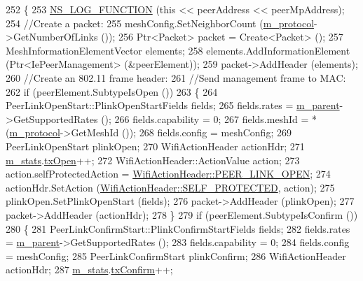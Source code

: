 \begin{DoxyCode}
252 \{
253   \hyperlink{log-macros-disabled_8h_a90b90d5bad1f39cb1b64923ea94c0761}{NS\_LOG\_FUNCTION} (\textcolor{keyword}{this} << peerAddress << peerMpAddress);
254   \textcolor{comment}{//Create a packet:}
255   meshConfig.SetNeighborCount (\hyperlink{classns3_1_1dot11s_1_1PeerManagementProtocolMac_afbdd1f31cd54c320267ffb3426559095}{m\_protocol}->GetNumberOfLinks ());
256   Ptr<Packet> packet = Create<Packet> ();
257   MeshInformationElementVector elements;
258   elements.AddInformationElement (Ptr<IePeerManagement> (&peerElement));
259   packet->AddHeader (elements);
260   \textcolor{comment}{//Create an 802.11 frame header:}
261   \textcolor{comment}{//Send management frame to MAC:}
262   \textcolor{keywordflow}{if} (peerElement.SubtypeIsOpen ())
263     \{
264       PeerLinkOpenStart::PlinkOpenStartFields fields;
265       fields.rates = \hyperlink{classns3_1_1dot11s_1_1PeerManagementProtocolMac_a14edf9af29af164f967ccc6e77d8ea03}{m\_parent}->GetSupportedRates ();
266       fields.capability = 0;
267       fields.meshId = *(\hyperlink{classns3_1_1dot11s_1_1PeerManagementProtocolMac_afbdd1f31cd54c320267ffb3426559095}{m\_protocol}->GetMeshId ());
268       fields.config = meshConfig;
269       PeerLinkOpenStart plinkOpen;
270       WifiActionHeader actionHdr;
271       \hyperlink{classns3_1_1dot11s_1_1PeerManagementProtocolMac_aaaccd87941623a8bff20e8998908b518}{m\_stats}.\hyperlink{structns3_1_1dot11s_1_1PeerManagementProtocolMac_1_1Statistics_a123e67cf28f2bc5fc27ae64dea07f5ab}{txOpen}++;
272       WifiActionHeader::ActionValue action;
273       action.selfProtectedAction = \hyperlink{classns3_1_1WifiActionHeader_a17cfd6c8f685a44e7b7b832cc9a53e83a5d1c8a5ef38c884f951cfe32e03ca572}{WifiActionHeader::PEER\_LINK\_OPEN};
274       actionHdr.SetAction (\hyperlink{classns3_1_1WifiActionHeader_a5402becd11b4077f22d76c4d0d923358a0d41e6327b2a9ae590e3020f378e40e4}{WifiActionHeader::SELF\_PROTECTED}, action); 
275       plinkOpen.SetPlinkOpenStart (fields);
276       packet->AddHeader (plinkOpen);
277       packet->AddHeader (actionHdr);
278     \}
279   \textcolor{keywordflow}{if} (peerElement.SubtypeIsConfirm ())
280     \{
281       PeerLinkConfirmStart::PlinkConfirmStartFields fields;
282       fields.rates = \hyperlink{classns3_1_1dot11s_1_1PeerManagementProtocolMac_a14edf9af29af164f967ccc6e77d8ea03}{m\_parent}->GetSupportedRates ();
283       fields.capability = 0;
284       fields.config = meshConfig;
285       PeerLinkConfirmStart plinkConfirm;
286       WifiActionHeader actionHdr;
287       \hyperlink{classns3_1_1dot11s_1_1PeerManagementProtocolMac_aaaccd87941623a8bff20e8998908b518}{m\_stats}.\hyperlink{structns3_1_1dot11s_1_1PeerManagementProtocolMac_1_1Statistics_a355443c5159b773a2506e919d97df368}{txConfirm}++;

\end{DoxyCode}
